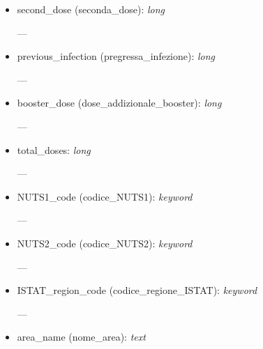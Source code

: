 \documentclass[12pt, a4paper]{article}
\begin{document}
\begin{itemize}
\begin{itemize}
                \begin{footnotesize}
                    ---
                \end{footnotesize}
            \item second\_dose (seconda\_dose): \emph{long} \\
                \begin{footnotesize}
                    ---
                \end{footnotesize}
            \item previous\_infection (pregressa\_infezione): \emph{long} \\
                \begin{footnotesize}
                    ---
                \end{footnotesize}
            \item booster\_dose (dose\_addizionale\_booster): \emph{long} \\
                \begin{footnotesize}
                    ---
                \end{footnotesize}
            \item total\_doses: \emph{long} \\
                \begin{footnotesize}
                    ---
                \end{footnotesize}
            \item NUTS1\_code (codice\_NUTS1): \emph{keyword} \\
                \begin{footnotesize}
                    ---
                \end{footnotesize}
            \item NUTS2\_code (codice\_NUTS2): \emph{keyword} \\
                \begin{footnotesize}
                    ---
                \end{footnotesize}
            \item ISTAT\_region\_code (codice\_regione\_ISTAT): \emph{keyword} \\
                \begin{footnotesize}
                    ---
                \end{footnotesize}
            \item area\_name (nome\_area): \emph{text} \\
                \begin{footnotesize}

\end{footnotesize}
\end{itemize}
\end{itemize}
\end{document}
